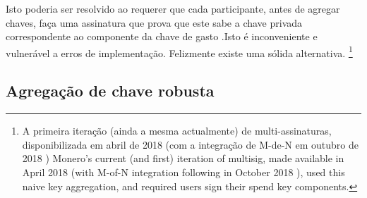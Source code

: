 

Isto poderia ser resolvido ao requerer que cada participante, antes de agregar chaves, faça uma assinatura que prova que este sabe a chave privada correspondente ao componente da chave de gasto \cite{old-multisig-mrl-note}.Isto é inconveniente e vulnerável a erros de implementação. Felizmente existe uma sólida alternativa. 
\footnote{A primeira iteração (ainda a mesma actualmente) de multi-assinaturas, disponibilizada em abril de 2018 \cite{lithiumluna-v7} (com a integração de M-de-N em outubro de 2018 \cite{berylliumbullet-v8})
Monero's current (and first) iteration of multisig, made available in April 2018 \cite{lithiumluna-v7} (with M-of-N integration following in October 2018 \cite{berylliumbullet-v8}), used this naive key aggregation, and required users sign their spend key components.}
\subsection{Agregação de chave robusta}
\label{sec:robust-key-aggregation}

